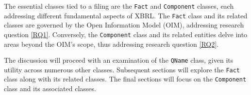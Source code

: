 The essential classes tied to a filing are the \texttt{Fact} and \texttt{Component} classes, each addressing different fundamental aspects of XBRL.
The \texttt{Fact} class and its related classes are governed by the Open Information Model (OIM)\cite{oim}, addressing research question \ref{RQ1}.
Conversely, the \texttt{Component} class and its related entities delve into areas beyond the OIM's scope, thus addressing research question \ref{RQ2}.

The discussion will proceed with an examination of the \texttt{QName} class, given its utility across numerous other classes.
Subsequent sections will explore the \texttt{Fact} class along with its related classes.
The final sections will focus on the \texttt{Component} class and its associated classes.




